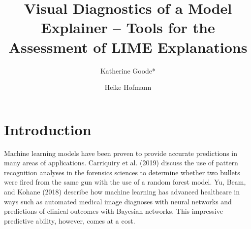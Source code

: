 \documentclass[AMS,STIX2COL]{WileyNJD-v2}
\begin{document}


\title{Visual Diagnostics of a Model Explainer -- Tools for the Assessment of LIME Explanations}

\author[1]{Katherine Goode*}

\author[1,2]{Heike Hofmann}


\address[1]{, , }

\address[2]{, , }






\maketitle

\section{Introduction}

Machine learning models have been proven to provide accurate predictions in many areas of applications. Carriquiry et al. (2019) discuss the use of pattern recognition analyses in the forensics sciences to determine whether two bullets were fired from the same gun with the use of a random forest model. Yu, Beam, and Kohane (2018) describe how machine learning has advanced healthcare in ways such as automated medical image diagnoses with neural networks and predictions of clinical outcomes with Bayesian networks. This impressive predictive ability, however, comes at a cost.
\end{document}
